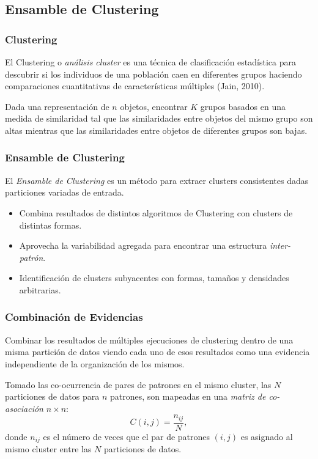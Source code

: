 \subsection{Ensamble de Clustering}
\begin{frame}
	\frametitle{Clustering}
	\begin{tcolorbox}[colback=blue!5,colframe=blue!40!black,title=Clustering]
		El Clustering o \textit{análisis cluster} es una técnica de clasificación estadística para descubrir si los individuos de una población caen en diferentes grupos haciendo comparaciones cuantitativas de características múltiples (Jain, 2010).
	\end{tcolorbox}

	\bigskip

	\begin{tcolorbox}[colback=blue!5,colframe=blue!40!black,title=Definición operativa]
		Dada una representación de \(n\) objetos, encontrar \(K\) grupos basados en una medida de similaridad tal que las similaridades entre objetos del mismo grupo son altas mientras que las similaridades entre objetos de diferentes grupos son bajas.
	\end{tcolorbox}
\end{frame}

\begin{frame}
	\frametitle{Ensamble de Clustering}
	\begin{tcolorbox}[colback=blue!5,colframe=blue!40!black,title=Ensamble de Clustering]
		El \textit{Ensamble de Clustering} es un método para extraer clusters consistentes dadas particiones variadas de entrada.
	\end{tcolorbox}

 	\bigskip

	\begin{itemize}
		\item Combina resultados de distintos algoritmos de Clustering con clusters de distintas formas.
		\item Aprovecha la variabilidad agregada para encontrar una estructura \textit{inter-patrón}.
		\item Identificación de clusters subyacentes con formas, tamaños y densidades arbitrarias.
	\end{itemize}
\end{frame}

\begin{frame}
	\frametitle{Combinación de Evidencias}
	Combinar los resultados de múltiples ejecuciones de clustering dentro de una misma partición de datos viendo cada uno de esos resultados como una evidencia independiente de la organización de los mismos.

	\bigskip

	Tomado las co-ocurrencia de pares de patrones en el mismo cluster, las \(N\) particiones de datos para \(n\) patrones, son mapeadas en una \textit{matriz de co-asociación} \(n \times n\):
	\[C(i,j)=\frac{n_{ij}}{N},\]
	donde \(n_{ij}\) es el número de veces que el par de patrones \((i,j)\) es asignado al mismo cluster entre las \(N\) particiones de datos.
\end{frame}
